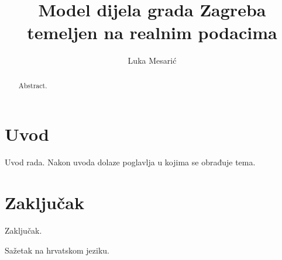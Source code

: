 \documentclass[times, utf8, zavrsni]{fer}
\begin{document}
\nocite{*}


\title{Model dijela grada Zagreba temeljen na realnim podacima}

\author{Luka Mesarić}

\maketitle

\izvornik

\zahvala{}

\tableofcontents

\chapter{Uvod}
Uvod rada. Nakon uvoda dolaze poglavlja u kojima se obrađuje tema.

\chapter{Zaključak}
Zaključak.




\begin{sazetak}
Sažetak na hrvatskom jeziku.

\end{sazetak}

\begin{abstract}
Abstract.

\end{abstract}
\end{document}
